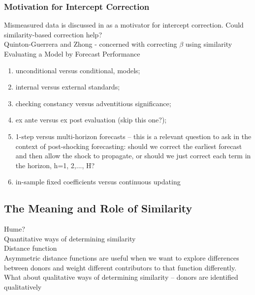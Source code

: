 \documentclass[11pt]{article}
\theoremstyle{definition}
\begin{document}
\subsubsection{Motivation for Intercept Correction}

Mismeasured data is discussed in \cite[p. 166]{hendry1994theory} as a motivator for intercept correction.  Could similarity-based correction help?\\

Quinton-Guerrera and Zhong - concerned with correcting $\beta$ using similarity\\

Evaluating a Model by Forecast Performance \cite{clements2005evaluating}
\begin{enumerate}

  \item   unconditional versus conditional, models;
  \item internal versus external standards;
  \item checking constancy versus adventitious significance;
  \item ex ante versus ex post evaluation (skip this one?);
  \item 1-step versus multi-horizon forecasts -- this is a relevant question to ask in the context of post-shocking forecasting: should we correct the earliest forecast and then allow the shock to propagate, or should we just correct each term in the horizon, h=1, 2,..., H?
  \item in-sample fixed coefficients versus continuous updating
\end{enumerate}
 
\subsection{The Meaning and Role of Similarity}
Hume?\\

Quantitative ways of determining similarity\\

Distance function\\

Asymmetric distance functions are useful when we want to explore differences between donors and weight different contributors to that function differently.\\

What about qualitative ways of determining similarity -- \cite{lundquist2024volatility} donors are identified qualitatively
\end{document}
